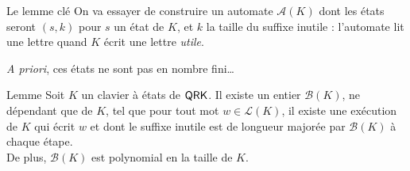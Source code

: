 \documentclass[11pt,french]{beamer}
\renewcommand{\L}{\mathcal{L}}
\newcommand{\A}{\mathcal{A}}
\begin{document}
\begin{frame}{Le lemme clé}
	On va essayer de construire un automate $\A(K)$ dont les états seront $(s,k)$ pour $s$ un état de $K$, et $k$ la taille du suffixe inutile : l'automate lit une lettre quand $K$ écrit une lettre \emph{utile}.
	\pause

	\emph{A priori}, ces états ne sont pas en nombre fini\dots 
	\pause
	\begin{alertblock}{Lemme}
		Soit $K$ un clavier à états de $\mathsf{QRK}$. Il existe un entier $\mathcal{B}(K)$, ne dépendant que de $K$, tel que pour tout mot $w \in \L(K)$,
        il existe une exécution de $K$ qui écrit $w$ et dont le suffixe inutile est de longueur majorée par $\mathcal{B}(K)$ à chaque étape. \\
        De plus, $\mathcal{B}(K)$ est polynomial en la taille de $K$.
	\end{alertblock}
\end{frame}
\end{document}
